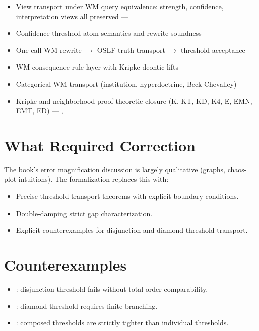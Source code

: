 \documentclass[11pt,openany]{report}
\begin{document}
\begin{itemize}
\item View transport under WM query equivalence: strength, confidence,
  interpretation views all preserved ---
\item Confidence-threshold atom semantics and rewrite soundness ---
\item One-call WM rewrite $\to$ OSLF truth transport $\to$ threshold
  acceptance --- 
\item WM consequence-rule layer with Kripke deontic lifts ---
\item Categorical WM transport (institution, hyperdoctrine,
  Beck-Chevalley) ---
\item Kripke and neighborhood proof-theoretic closure (K, KT, KD, K4,
  E, EMN, EMT, ED) ---
  ,
\end{itemize}

\section{What Required Correction}

The book's error magnification discussion is largely qualitative
(graphs, chaos-plot intuitions).  The formalization replaces this with:

\begin{itemize}
\item Precise threshold transport theorems with explicit boundary conditions.
\item Double-damping strict gap characterization.
\item Explicit counterexamples for disjunction and diamond threshold
  transport.
\end{itemize}

\section{Counterexamples}

\begin{itemize}
\item {}: disjunction threshold fails
  without total-order comparability.
\item {}: diamond threshold requires finite
  branching.
\item {}: composed thresholds are
  strictly tighter than individual thresholds.
\end{itemize}
\end{document}
